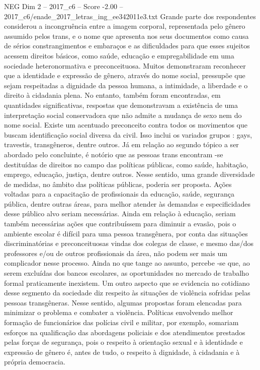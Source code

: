 \begin{textsample}{NEG Dim 2 – 2017\_c6 – Score -2.00 – 2017\_c6/enade\_2017\_letras\_ing\_ee342011e3.txt}
Grande parte dos respondentes considerou a incongruência entre a imagem corporal, representada pelo gênero assumido pelos trans, e o nome que apresenta nos seus documentos como causa de sérios constrangimentos e embaraços e as dificuldades para que esses sujeitos acessem direitos básicos, como saúde, educação e empregabilidade em uma sociedade heteronormativa e preconceituosa.
Muitos demonstraram reconhecer que a identidade e expressão de gênero, através do nome social, pressupõe que sejam respeitadas a dignidade da pessoa humana, a intimidade, a liberdade e o direito à cidadania plena.
No entanto, também foram encontradas, em quantidades significativas, respostas que demonstravam a existência de uma interpretação social conservadora que não admite a mudança de sexo nem do nome social.
Existe um acentuado preconceito contra todos os movimentos que buscam identificação social diversa da civil.
Isso inclui os variados grupos : gays, travestis, transgêneros, dentre outros.
Já em relação ao segundo tópico a ser abordado pelo concluinte, é notório que as pessoas trans encontram -se destituídas de direitos no campo das políticas públicas, como saúde, habitação, emprego, educação, justiça, dentre outros.
Nesse sentido, uma grande diversidade de medidas, no âmbito das políticas públicas, poderia ser proposta.
Ações voltadas para a capacitação de profissionais da educação, saúde, segurança pública, dentre outras áreas, para melhor atender às demandas e especificidades desse público alvo seriam necessárias.
Ainda em relação à educação, seriam também necessárias ações que contribuíssem para diminuir a evasão, pois o ambiente escolar é difícil para uma pessoa transgênera, por conta das situações discriminatórias e preconceituosas vindas dos colegas de classe, e mesmo das/dos professores e/ou de outros profissionais da área, não podem ser mais um complicador nesse processo.
Ainda no que tange ao assunto, percebe -se que, ao serem excluídas dos bancos escolares, as oportunidades no mercado de trabalho formal praticamente inexistem.
Um outro aspecto que se evidencia no cotidiano desse segmento da sociedade diz respeito às situações de violência sofridas pelas pessoas transgêneras.
Nesse sentido, algumas propostas foram elencadas para minimizar o problema e combater a violência.
Políticas envolvendo melhor formação de funcionários das polícias civil e militar, por exemplo, somariam esforços na qualificação das abordagens policiais e dos atendimentos prestados pelas forças de segurança, pois o respeito à orientação sexual e à identidade e expressão de gênero é, antes de tudo, o respeito à dignidade, à cidadania e à própria democracia.

\end{textsample}
